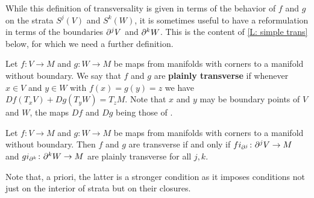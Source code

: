 While this definition of transversality is given in terms of the behavior of $f$ and $g$ on the strata $S^j(V)$ and $S^k(W)$, it is sometimes useful to have a reformulation in terms of the boundaries $\partial^j V$ and $\partial^kW$.
This is the content of \cref{L: simple trans} below, for which we need a further definition.

\begin{definition}\label{D: plain transversality}
Let $f \colon V \to M$ and $g \colon W \to M$ be maps from manifolds with corners to a manifold without boundary.
We say that $f$ and $g$ are \textbf{plainly transverse} if whenever $x \in V$ and $y\in W$ with $f(x) = g(y) = z$ we have $Df(T_xV)+Dg(T_yW) = T_z M$. Note that $x$ and $y$ may be boundary points of $V$ and $W$, the maps $Df$ and $Dg$ being those of \cite[Definition 3.2]{Joy12}.
\end{definition}

\begin{comment}
To be explicit in the case that $x \in V-S^0(V)$ or $y \in W-S^0(W)$ with $f(x) = g(y)$, let $(U_x,\phi_x)$ and $(U_y,\phi_y)$ be charts with $\phi_x(0) = x$ and $\phi_y(0) = y$.
By definition of smoothness, there exist neighborhoods $N_x$ and $N_y$ of $0$ in $\R^v$ and $\R^w$, respectively, so that $f\phi_x$ and $g\phi_y$ extend to smooth maps $\psi_x \colon N_x \to M$ and $\psi_y \colon N_y \to M$.
Then $f$ and $g$ are plainly transverse at $x$ and $y$ if $D\psi_x(T_0 \R^v)+D\psi_y(T_0\R^w) = T_{f(x)}M$.
This property is independent of the involved choices as $D\psi_x(T_0 \R^v)$ is the limit of $D\psi_x(T_{a} \R^v)$ for $a$ taken along any smooth path in $U_x$, and this does not depend on the choice of $N_x$ or $\psi_x$, and similarly for $\psi_y$.
\end{comment}

\begin{lemma}\label{L: simple trans}
	Let $f \colon V \to M$ and $g \colon W \to M$ be maps from manifolds with corners to a manifold without boundary.
	Then $f$ and $g$ are transverse if and only if $fi_{\partial^j} \colon \partial^jV \to M$ and $gi_{\partial^k} \colon \partial^kW \to M$ are plainly transverse for all $j,k$.
\end{lemma}

Note that, a priori, the latter is a stronger condition as it imposes conditions not just on the interior of strata but on their closures.

